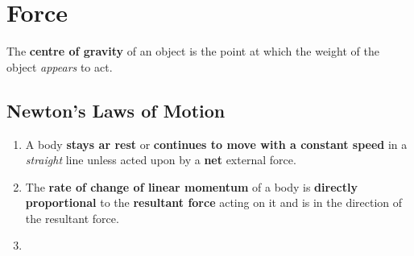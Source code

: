 \section{Force}

\begin{definition}
The \textbf{centre of gravity} of an object is the point at which the weight of the object \emph{appears} to act. 
\end{definition}

\subsection{Newton's Laws of Motion}
\begin{definition}
    \begin{enumerate} The following are Newton's 3 laws:
        \item A body \textbf{stays ar rest} or \textbf{continues to move with a constant speed} in a \emph{straight} line unless acted upon by a \textbf{net} external force. 
        \item The \textbf{rate of change of linear momentum} of a body is \textbf{directly proportional} to the \textbf{resultant force} acting on it and is in the direction of the resultant force.
        \item 
    \end{enumerate}
\end{definition}

